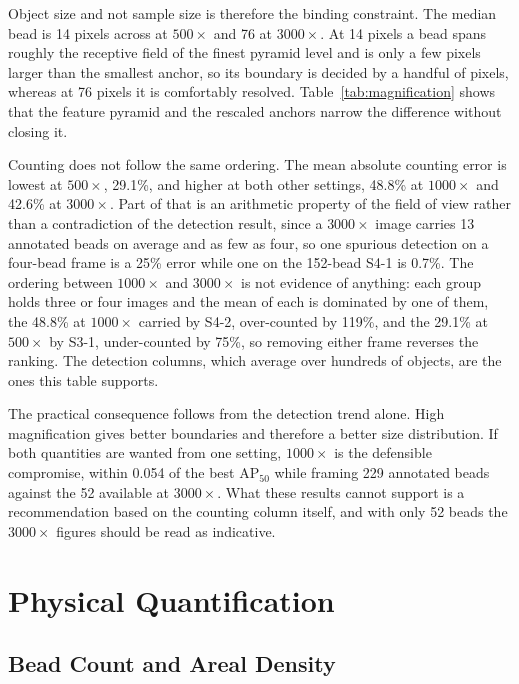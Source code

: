 Object size and not sample size is therefore the binding constraint. The median
bead is 14 pixels across at $500\times$ and 76 at $3000\times$. At 14 pixels a
bead spans roughly the receptive field of the finest pyramid level and is only a
few pixels larger than the smallest anchor, so its boundary is decided by a
handful of pixels, whereas at 76 pixels it is comfortably resolved.
Table~\ref{tab:magnification} shows that the feature pyramid and the rescaled
anchors narrow the difference without closing it.

Counting does not follow the same ordering. The mean absolute counting error is
lowest at $500\times$, 29.1\%, and higher at both other settings, 48.8\% at
$1000\times$ and 42.6\% at $3000\times$. Part of that is an arithmetic property of
the field of view rather than a contradiction of the detection result, since a
$3000\times$ image carries 13 annotated beads on average and as few as four,
so one spurious detection on a four-bead frame is a 25\% error while one on the
152-bead S4-1 is 0.7\%. The ordering between $1000\times$ and $3000\times$ is not
evidence of anything: each group holds three or four images and the mean of
each is dominated by one of them, the 48.8\% at $1000\times$ carried by S4-2,
over-counted by 119\%, and the 29.1\% at $500\times$ by S3-1, under-counted by
75\%, so removing either frame reverses the ranking. The detection columns, which
average over hundreds of objects, are the ones this table supports.

The practical consequence follows from the detection trend alone. High
magnification gives better boundaries and therefore a better size distribution. If
both quantities are wanted from one setting, $1000\times$ is the defensible
compromise, within 0.054 of the best $\mathrm{AP}_{50}$ while framing 229
annotated beads against the 52 available at $3000\times$. What these results
cannot support is a recommendation based on the counting column itself, and with
only 52 beads the $3000\times$ figures should be read as indicative.

\section{Physical Quantification}

\subsection{Bead Count and Areal Density}
\label{sec:counting}

